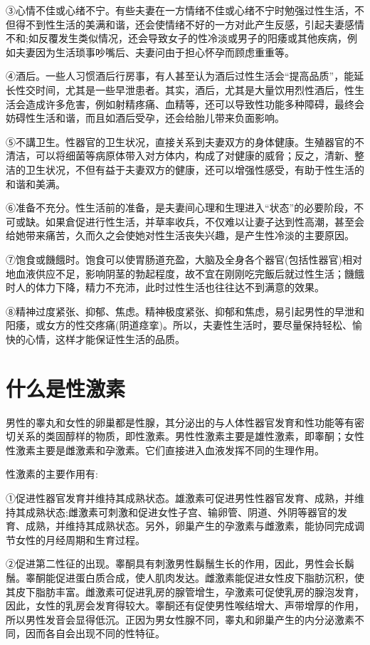 \documentclass[12pt,UTF8]{ctexbook}
\begin{document}
③心情不佳或心绪不宁。有些夫妻在一方情绪不佳或心绪不宁时勉强过性生活，不但得不到性生活的美满和谐，还会使情绪不好的一方对此产生反感，引起夫妻感情不和;如反覆发生类似情况，还会导致女子的性冷淡或男子的阳痿或其他疾病，例如夫妻因为生活琐事吵嘴后、夫妻问由于担心怀孕而顾虑重重等。

④酒后。一些人习惯酒后行房事，有人甚至认为酒后过性生活会“提高品质”，能延长性交时间，尤其是一些早泄患者。其实，酒后，尤其是大量饮用烈性酒后，性生活会造成许多危害，例如射精疼痛、血精等，还可以导致性功能多种障碍，最终会妨碍性生活和谐，而且如酒后受孕，还会给胎儿带来负面影响。

⑤不講卫生。性器官的卫生状况，直接关系到夫妻双方的身体健康。生殖器官的不清洁，可以将细菌等病原体带入对方体内，构成了对健康的威脅；反之，清新、整洁的卫生状况，不但有益于夫妻双方的健康，还可以增强性感受，有助于性生活的和谐和美满。

⑥准备不充分。性生活前的准备，是夫妻间心理和生理进入“状态”的必要阶段，不可或缺。如果倉促进行性生活，并草率收兵，不仅难以让妻子达到性高潮，甚至会给她带来痛苦，久而久之会使她对性生活丧失兴趣，是产生性冷淡的主要原因。

⑦饱食或饑餓时。饱食可以使胃肠道充盈，大脑及全身各个器官(包括性器官)相对地血液供应不足，影响阴茎的勃起程度，故不宜在刚刚吃完飯后就过性生活；饑餓时人的体力下降，精力不充沛，此时过性生活也往往达不到满意的效果。

⑧精神过度紧张、抑郁、焦虑。精神极度紧张、抑郁和焦虑，易引起男性的早泄和阳痿，或女方的性交疼痛(阴道痉挛)。所以，夫妻性生活时，要尽量保持轻松、愉快的心情，这样才能保证性生活的品质。

\section{什么是性激素}

男性的睾丸和女性的卵巢都是性腺，其分泌出的与人体性器官发育和性功能等有密切关系的类固醇样的物质，即性激素。男性性激素主要是雄性激素，即睾酮；女性性激素主要是雌激素和孕激素。它们直接进入血液发挥不同的生理作用。

性激素的主要作用有:

①促进性器官发育并维持其成熟状态。雄激素可促进男性性器官发育、成熟，并维持其成熟状态;雌激素可刺激和促进女性子宫、输卵管、阴道、外阴等器官的发育、成熟，并维持其成熟状态。另外，卵巢产生的孕激素与雌激素，能协同完成调节女性的月经周期和生育过程。

②促进第二性征的出现。睾酮具有刺激男性鬍鬚生长的作用，因此，男性会长鬍鬚。睾酮能促进蛋白质合成，使人肌肉发达。雌激素能促进女性皮下脂肪沉积，使其皮下脂肪丰富。雌激素可促进乳房的腺管增生，孕激素可促使乳房的腺泡发育，因此，女性的乳房会发育得较大。睾酮还有促使男性喉结增大、声带增厚的作用，所以男性发音会显得低沉。正因为男女性腺不同，睾丸和卵巢产生的内分泌激素不同，因而各自会出现不同的性特征。
\end{document}
